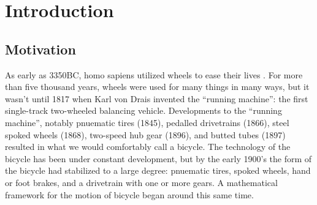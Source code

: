 \chapter{Introduction}
\setcounter{section}{-1}
\section{Motivation}

As early as 3350BC, homo sapiens utilized wheels to ease
their lives . For more than five thousand years, wheels were
used for many things in many ways, but it wasn't until 1817 when Karl von Drais
invented the ``running machine'': the first single-track two-wheeled balancing
vehicle. Developments to the ``running machine'', notably pnuematic tires (1845),
pedalled drivetrains (1866), steel spoked wheels (1868), two-speed hub gear
(1896), and butted tubes (1897) resulted in what we would comfortably call a
bicycle. The technology of the bicycle has been under constant development, but
by the early 1900's the form of the bicycle had stabilized to a large degree:
pnuematic tires, spoked wheels, hand or foot brakes, and a drivetrain with one
or more gears. A mathematical framework for the motion of bicycle began
around this same time\cite{Whipple1899}.
